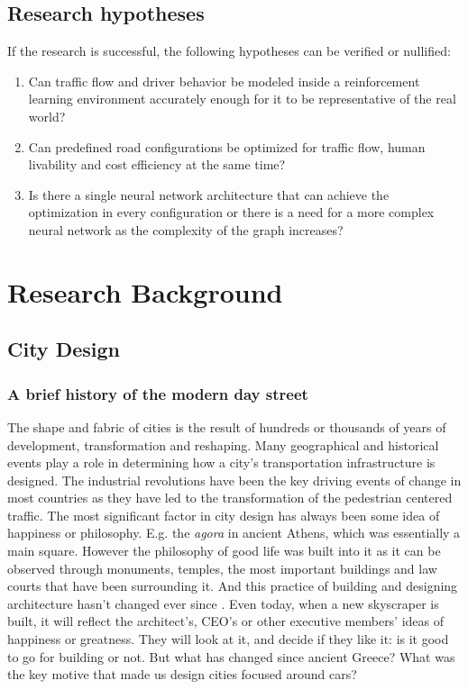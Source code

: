 \documentclass[
]{elteikthesis}[2023/04/10]
\begin{document}
\section{Research hypotheses}

If the research is successful, the following hypotheses can be verified
or nullified: 
\begin{enumerate}
\item Can traffic flow and driver behavior be modeled inside a reinforcement
learning environment accurately enough for it to be representative
of the real world?
\item Can predefined road configurations be optimized for traffic flow,
human livability and cost efficiency at the same time?
\item Is there a single neural network architecture that can achieve the
optimization in every configuration or there is a need for a more
complex neural network as the complexity of the graph increases? 
\end{enumerate}
\newpage{}

\chapter{Research Background}

\section{City Design}

\subsection{A brief history of the modern day street}

The shape and fabric of cities is the result of hundreds or thousands
of years of development, transformation and reshaping. Many geographical
and historical events play a role in determining how a city's transportation
infrastructure is designed. The industrial revolutions have been the
key driving events of change in most countries as they have led to
the transformation of the pedestrian centered traffic. The most significant
factor in city design has always been some idea of happiness or philosophy.
E.g. the \emph{agora} in ancient Athens, which was essentially a main
square. However the philosophy of good life was built into it as it
can be observed through monuments, temples, the most important buildings
and law courts that have been surrounding it. And this practice of
building and designing architecture hasn't changed ever since \cite{jette2013book}.
Even today, when a new skyscraper is built, it will reflect the architect's,
CEO's or other executive members' ideas of happiness or greatness.
They will look at it, and decide if they like it: is it good to go
for building or not. But what has changed since ancient Greece? What
was the key motive that made us design cities focused around cars? 
\end{document}

